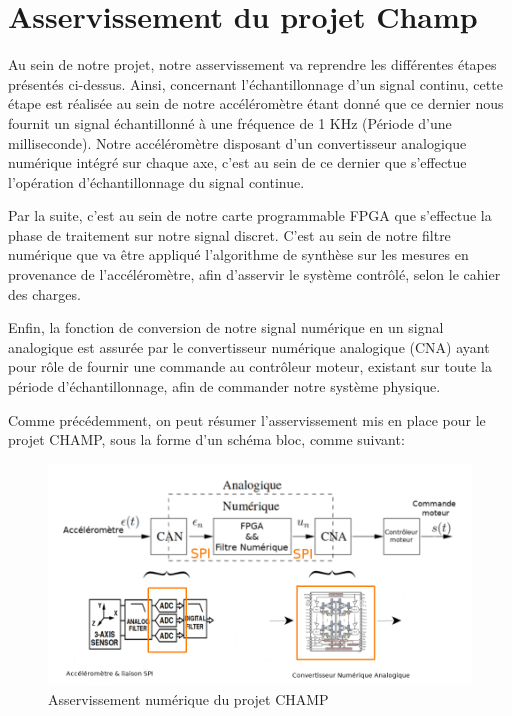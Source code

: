 \documentclass[french,a4paper,12pt]{report}
\begin{document}
	\chapter{Asservissement du projet Champ}
	
		Au sein de notre projet, notre asservissement va reprendre les différentes étapes présentés ci-dessus. Ainsi, concernant l'échantillonnage d'un signal continu, cette étape est réalisée au sein de notre accéléromètre étant donné que ce dernier nous fournit un signal échantillonné à une fréquence de 1 KHz (Période d'une milliseconde). Notre accéléromètre disposant d'un convertisseur analogique numérique intégré sur chaque axe, c'est au sein de ce dernier que s'effectue l'opération d'échantillonnage du signal continue.
		
		Par la suite, c'est au sein de notre carte programmable FPGA que s'effectue la phase de traitement sur notre signal discret. C'est au sein de notre filtre numérique que va être appliqué l'algorithme de synthèse sur les mesures en provenance de l'accéléromètre, afin d'asservir le système contrôlé, selon le cahier des charges.
				
		Enfin, la fonction de conversion de notre signal numérique en un signal analogique est assurée par le convertisseur numérique analogique (CNA) ayant pour rôle de fournir une commande au contrôleur moteur, existant sur toute la période d'échantillonnage, afin de commander notre système physique.
		
		Comme précédemment, on peut résumer l'asservissement mis en place pour le projet CHAMP, sous la forme d'un schéma bloc, comme suivant:
		
	\begin{figure}[!ht]
    \center
  	\includegraphics[width=12cm]{Assert_2.png}
    \caption{Asservissement numérique du projet CHAMP}
	\end{figure}	
		
\end{document}

